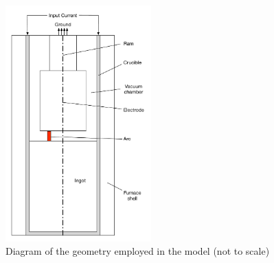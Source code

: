 \documentclass[onehalf,11pt]{beavtex}
\begin{document}
\begin{figure}[htbp]
\centering
	\includegraphics[width=0.5\textwidth]{VAR-diagram.pdf}
	\caption{Diagram of the geometry employed in the model (not to scale)}
	\label{fig:diagram}
\end{figure}
\end{document}
